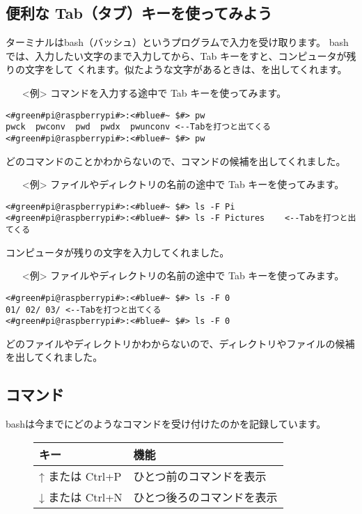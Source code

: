 \subsection{便利な Tab（タブ）キーを使ってみよう}
ターミナルはbash（バッシュ）というプログラムで入力を受け取ります。
bashでは、入力したい文字のまで入力してから、Tab キーをすと、コンピュータが残りの文字をして
くれます。似たような文字があるときは、を出してくれます。
\begin{itemize}
\item[<例>]コマンドを入力する途中で Tab キーを使ってみます。
\end{itemize}
\begin{lstlisting}[caption=Tabの例1, label=Tab1]
<#green#pi@raspberrypi#>:<#blue#~ $#> pw
pwck  pwconv  pwd  pwdx  pwunconv <--Tabを打つと出てくる
<#green#pi@raspberrypi#>:<#blue#~ $#> pw
\end{lstlisting}
どのコマンドのことかわからないので、コマンドの候補を出してくれました。
\begin{itemize}
\item[<例>]ファイルやディレクトリの名前の途中で Tab キーを使ってみます。
\end{itemize}
\begin{lstlisting}[caption=Tabの例2, label=Tab2]
<#green#pi@raspberrypi#>:<#blue#~ $#> ls -F Pi
<#green#pi@raspberrypi#>:<#blue#~ $#> ls -F Pictures	<--Tabを打つと出てくる
\end{lstlisting}
コンピュータが残りの文字を入力してくれました。
\begin{itemize}
\item[<例>]ファイルやディレクトリの名前の途中で Tab キーを使ってみます。
\end{itemize}
\begin{lstlisting}[caption=Tabの例3, label=Tab3]
<#green#pi@raspberrypi#>:<#blue#~ $#> ls -F 0
01/	02/	03/	<--Tabを打つと出てくる
<#green#pi@raspberrypi#>:<#blue#~ $#> ls -F 0
\end{lstlisting}
どのファイルやディレクトリかわからないので、ディレクトリやファイルの候補を出してくれました。

\subsection{コマンド}
bashは今までにどのようなコマンドを受け付けたのかを記録しています。
\begin{figure}[h]
  \begin{tabular}{ll}\hline
    キー & 機能 \\ \hline
    ↑ または Ctrl+P & ひとつ前のコマンドを表示\\
    ↓ または Ctrl+N & ひとつ後ろのコマンドを表示\\ \hline
  \end{tabular}
\end{figure}

